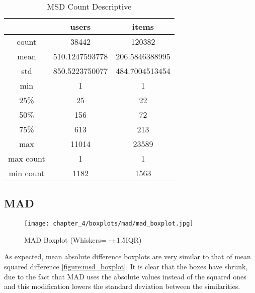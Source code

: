 \begin{table}[H]
\centering
\caption{MSD Count Descriptive}
\label{msd_count_descriptive}
\begin{tabular}{|c|c|c|}
\hline
          & \textbf{users} & \textbf{items} \\ \hline
count     & 38442          & 120382         \\ \hline
mean      & 510.1247593778 & 206.5846388995 \\ \hline
std       & 850.5223750077 & 484.7004513454 \\ \hline
min       & 1              & 1              \\ \hline
25\%      & 25             & 22             \\ \hline
50\%      & 156            & 72             \\ \hline
75\%      & 613            & 213            \\ \hline
max       & 11014          & 23589          \\ \hline
max count & 1              & 1              \\ \hline
min count & 1182           & 1563           \\ \hline
\end{tabular}
\end{table}

\subsection{MAD}

\begin{figure}[H]
\centering
\texttt{[image: chapter\_4/boxplots/mad/mad\_boxplot.jpg]}
\caption{MAD Boxplot (Whiskers= -+1.5IQR)}
\label{figure:mad_boxplot}
\end{figure}

As expected, mean absolute difference boxplots are very similar to that of mean squared difference
\autoref{figure:msd_boxplot}. It is clear that the boxes have shrunk, due to the
fact that MAD uses the absolute values instead of the squared ones and this modification
lowers the standard deviation between the similarities.

